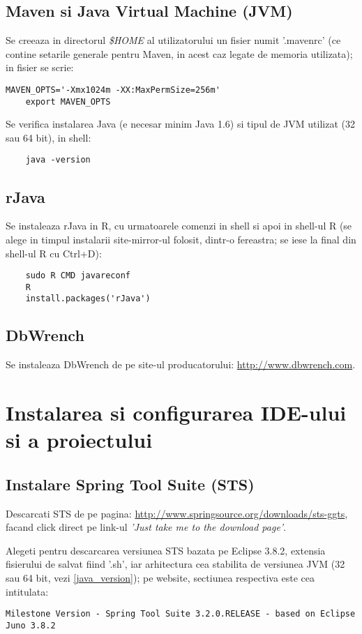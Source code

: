 \subsection{Maven si Java Virtual Machine (JVM)}
Se creeaza in directorul \emph{\$HOME} al utilizatorului un fisier numit
'.mavenrc' 
(ce contine setarile generale pentru Maven, in acest caz legate de memoria utilizata);
in fisier se scrie:
\begin{lstlisting}[breaklines=true]
	MAVEN_OPTS='-Xmx1024m -XX:MaxPermSize=256m'
	export MAVEN_OPTS
\end{lstlisting}

\label{java_version}
Se verifica instalarea Java (e necesar minim Java 1.6) si tipul de JVM
utilizat (32 sau 64 bit), in shell:
\begin{lstlisting}
	java -version
\end{lstlisting}

\subsection{rJava}
Se instaleaza rJava in R, cu urmatoarele comenzi in shell si apoi in shell-ul R
(se alege in timpul instalarii site-mirror-ul folosit, dintr-o fereastra;
se iese la final din shell-ul R cu Ctrl+D):
\begin{lstlisting}
	sudo R CMD javareconf
	R
	install.packages('rJava')
\end{lstlisting}

\subsection{DbWrench}
Se instaleaza DbWrench de pe site-ul producatorului:
\url{http://www.dbwrench.com}.

\section{Instalarea si configurarea IDE-ului si a proiectului}

\subsection{Instalare Spring Tool Suite (STS)}
Descarcati STS de pe pagina:
\url{http://www.springsource.org/downloads/sts-ggts},
facand click direct pe link-ul \emph{'Just take me to the download page'}.

Alegeti pentru descarcarea versiunea STS bazata pe Eclipse 3.8.2, extensia
fisierului de salvat fiind '.sh', iar arhitectura cea stabilita de versiunea
JVM (32 sau 64 bit, vezi \ref{java_version}); pe website, sectiunea respectiva
este cea intitulata:
\begin{lstlisting}[breaklines=true]
Milestone Version - Spring Tool Suite 3.2.0.RELEASE - based on Eclipse Juno 3.8.2
\end{lstlisting}

